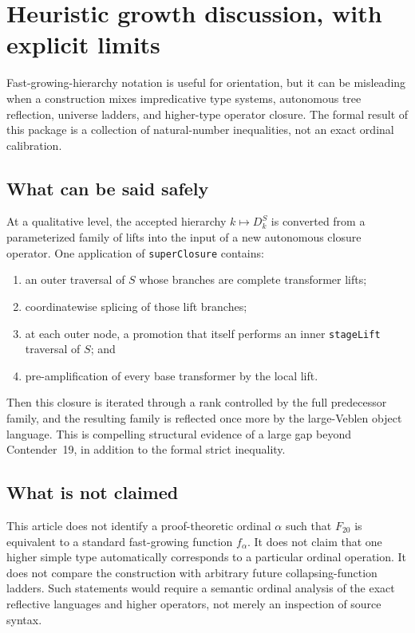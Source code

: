 \documentclass[11pt]{article}
\theoremstyle{definition}
\theoremstyle{remark}
\newcommand{\leanname}[1]{\nolinkurl{#1}}
\begin{document}
\section{Heuristic growth discussion, with explicit limits}

Fast-growing-hierarchy notation is useful for orientation, but it can be
misleading when a construction mixes impredicative type systems, autonomous
tree reflection, universe ladders, and higher-type operator closure.  The
formal result of this package is a collection of natural-number inequalities,
not an exact ordinal calibration.

\subsection{What can be said safely}

At a qualitative level, the accepted hierarchy
$k\mapsto D^S_k$ is converted from a parameterized family of lifts into the
input of a new autonomous closure operator.  One application of
\leanname{superClosure} contains:

\begin{enumerate}[leftmargin=*]
\item an outer traversal of $S$ whose branches are complete transformer lifts;
\item coordinatewise splicing of those lift branches;
\item at each outer node, a promotion that itself performs an inner
  \leanname{stageLift} traversal of $S$; and
\item pre-amplification of every base transformer by the local lift.
\end{enumerate}

Then this closure is iterated through a rank controlled by the full predecessor
family, and the resulting family is reflected once more by the large-Veblen
object language.  This is compelling structural evidence of a large gap beyond
Contender~19, in addition to the formal strict inequality.

\subsection{What is not claimed}

This article does not identify a proof-theoretic ordinal $\alpha$ such that
$F_{20}$ is equivalent to a standard fast-growing function $f_\alpha$.  It does
not claim that one higher simple type automatically corresponds to a particular
ordinal operation.  It does not compare the construction with arbitrary future
collapsing-function ladders.  Such statements would require a semantic ordinal
analysis of the exact reflective languages and higher operators, not merely an
inspection of source syntax.
\end{document}
